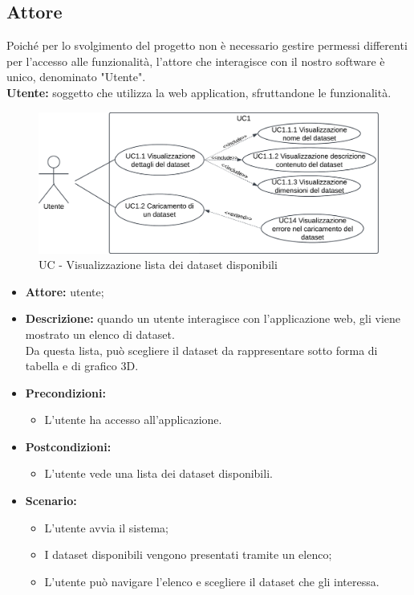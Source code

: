 \subsection{Attore}
Poiché per lo svolgimento del progetto non è necessario gestire permessi differenti per l'accesso alle funzionalità, l'attore che interagisce con il nostro software è unico, denominato "Utente".\\
\textbf{Utente:} soggetto che utilizza la web application, sfruttandone le funzionalità.
    \begin{figure}[h!]
        \centering
        \includegraphics[scale=0.7]{template/images/UC1.png}
        \caption{UC - Visualizzazione lista dei dataset disponibili}
    \end{figure}
    \begin{itemize}
        \item \textbf{Attore:} utente;
        \item \textbf{Descrizione:} quando un utente interagisce con l'applicazione web,
        gli viene mostrato un elenco di dataset.\\ Da questa lista, può scegliere il dataset da rappresentare sotto forma di tabella e di grafico 3D.
        \item \textbf{Precondizioni:}
        \begin{itemize}
            \item L'utente ha accesso all'applicazione.
        \end{itemize}
        \item \textbf{Postcondizioni:}
        \begin{itemize}
            \item L'utente vede una lista dei dataset disponibili.
        \end{itemize}
        \item \textbf{Scenario:} 
        \begin{itemize}
            \item L'utente avvia il sistema;
            \item I dataset disponibili vengono presentati tramite un elenco;
            \item L'utente può navigare l'elenco e scegliere il dataset che gli interessa.
        \end{itemize}
    \end{itemize}
    \newpage

